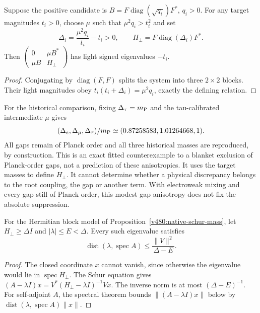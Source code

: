\begin{proposition}
\label{v480:planck-nonflat-fit-freedom}
Suppose the positive candidate is
$B=F\operatorname{diag}(\sqrt{q_i})F^*$, $q_i>0$.
For any target magnitudes $t_i>0$, choose $\mu$ such that
$\mu^2q_i>t_i^2$ and set
\[
 \Delta_i=\frac{\mu^2q_i}{t_i}-t_i>0,\qquad
 H_\perp=F\operatorname{diag}(\Delta_i)F^*.
\]
Then $\left(\begin{smallmatrix}0&\mu B^*\\\mu B&H_\perp
\end{smallmatrix}\right)$ has light signed eigenvalues $-t_i$.
\end{proposition}
\begin{proof}
Conjugating by $\operatorname{diag}(F,F)$ splits the system into
three $2\times2$ blocks. Their light magnitudes obey
$t_i(t_i+\Delta_i)=\mu^2q_i$, exactly the defining relation.
\end{proof}

For the historical comparison, fixing $\Delta_\tau=m_{\rm P}$
and the tau-calibrated intermediate $\mu$ gives
\[
 (\Delta_e,\Delta_\mu,\Delta_\tau)/m_{\rm P}
 \simeq(0.87258583,1.01264668,1).
\]
All gaps remain of Planck order and all three historical masses are
reproduced, by construction. This is an exact fitted counterexample
to a blanket exclusion of Planck-order gaps, not a prediction of these
anisotropies. It uses the target masses to define $H_\perp$.
It cannot determine whether a physical discrepancy belongs to the
root coupling, the gap or another term. With electroweak mixing
and every gap still of Planck order, this modest gap anisotropy
does not fix the absolute suppression.

\begin{proposition}
\label{v480:planck-direct-block-bound}
For the Hermitian block model of Proposition~\ref{v480:native-schur-mass},
let $H_\perp\geq\Delta I$ and $|\lambda|\leq E<\Delta$.
Every such eigenvalue satisfies
\[
 \operatorname{dist}(\lambda,\operatorname{spec}A)
 \leq\frac{\|V\|^2}{\Delta-E}.
\]
\end{proposition}
\begin{proof}
The closed coordinate $x$ cannot vanish, since otherwise the
eigenvalue would lie in $\operatorname{spec}H_\perp$.
The Schur equation gives
$(A-\lambda I)x=V^*(H_\perp-\lambda I)^{-1}Vx$.
The inverse norm is at most $(\Delta-E)^{-1}$. For self-adjoint
$A$, the spectral theorem bounds
$\|(A-\lambda I)x\|$ below by
$\operatorname{dist}(\lambda,\operatorname{spec}A)\|x\|$.
\end{proof}

